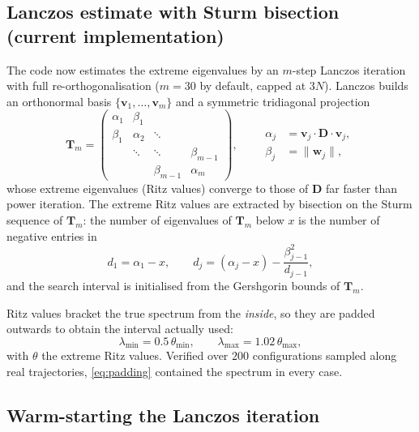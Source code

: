 \documentclass[11pt,a4paper]{report}
\newcommand{\D}{\bm{D}}
\begin{document}
\subsection{Lanczos estimate with Sturm bisection (current implementation)}

The code now estimates the extreme eigenvalues by an $m$-step Lanczos iteration
with full re-orthogonalisation ($m = 30$ by default, capped at $3N$). Lanczos
builds an orthonormal basis $\{\bm{v}_1,\dots,\bm{v}_m\}$ and a symmetric
tridiagonal projection
\begin{equation}
  \bm{T}_m =
  \begin{pmatrix}
    \alpha_1 & \beta_1 & & \\
    \beta_1 & \alpha_2 & \ddots & \\
     & \ddots & \ddots & \beta_{m-1}\\
     & & \beta_{m-1} & \alpha_m
  \end{pmatrix},
  \qquad
  \begin{aligned}
    \alpha_j &= \bm{v}_j\cdot\D\cdot\bm{v}_j,\\
    \beta_j  &= \|\bm{w}_j\|,
  \end{aligned}
\end{equation}
whose extreme eigenvalues (Ritz values) converge to those of $\D$ far faster than
power iteration. The extreme Ritz values are extracted by bisection on the Sturm
sequence of $\bm{T}_m$: the number of eigenvalues of $\bm{T}_m$ below $x$ is the
number of negative entries in
\begin{equation}
  d_1 = \alpha_1 - x, \qquad
  d_j = (\alpha_j - x) - \frac{\beta_{j-1}^{2}}{d_{j-1}},
\end{equation}
and the search interval is initialised from the Gershgorin bounds of
$\bm{T}_m$.

Ritz values bracket the true spectrum from the \emph{inside}, so they are padded
outwards to obtain the interval actually used:
\begin{equation}
  \lambda_{\min} = 0.5\,\theta_{\min}, \qquad
  \lambda_{\max} = 1.02\,\theta_{\max},
  \label{eq:padding}
\end{equation}
with $\theta$ the extreme Ritz values. Verified over $200$ configurations sampled
along real trajectories, \eqref{eq:padding} contained the spectrum in every case.

\subsection{Warm-starting the Lanczos iteration}
\label{sec:warm-start}
\end{document}
